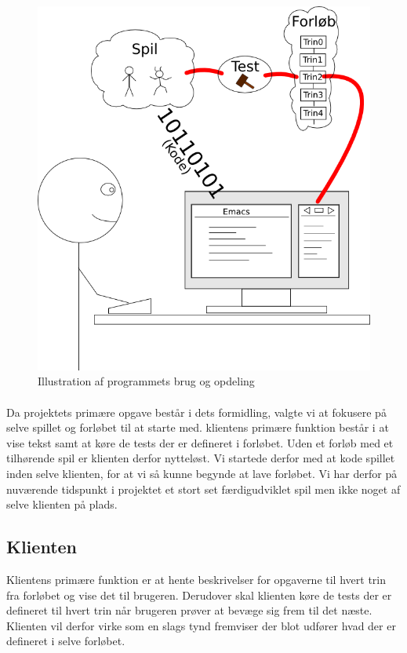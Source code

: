 \documentclass[10pt,a4paper,danish]{article}
\begin{document}
\begin{figure}[h!]
  \begin{center}
    \includegraphics[scale=0.5]{afl3_brug_og_opdeling.png}
    \caption{Illustration af programmets brug og opdeling}
    \label{fig:brug_og_opdeling}
  \end{center}
\end{figure}


\paragraph{}
Da projektets primære opgave består i dets formidling, valgte vi at fokusere på selve spillet og forløbet til at starte med. klientens primære funktion består i at vise tekst samt at køre de tests der er defineret i forløbet. Uden et forløb med et tilhørende spil er klienten derfor nytteløst.
Vi startede derfor med at kode spillet inden selve klienten, for at vi så kunne begynde at lave forløbet. Vi har derfor på nuværende tidspunkt i projektet et stort set færdigudviklet spil men ikke noget af selve klienten på plads.

\subsection{Klienten}
Klientens primære funktion er at hente beskrivelser for opgaverne til hvert trin fra forløbet og vise det til brugeren. Derudover skal klienten køre de tests der er defineret til hvert trin når brugeren prøver at bevæge sig frem til det næste. Klienten vil derfor virke som en slags tynd fremviser der blot udfører hvad der er defineret i selve forløbet.
\end{document}
